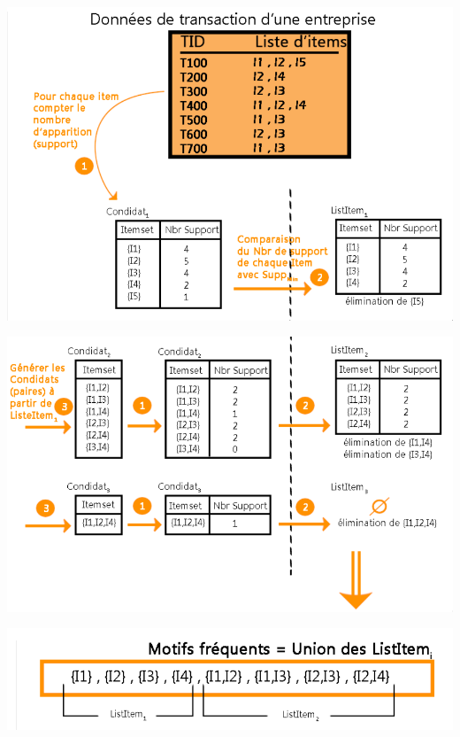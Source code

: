 \documentclass[12pt,a4paper,oneside]{book}
\begin{document}
\begin{center}
	\includegraphics[width=1\textwidth]{image/dm1.PNG}%
\end{center}
\begin{center}
	\includegraphics[width=1\textwidth]{image/dm2.PNG}%
\end{center}
\begin{center}
	\includegraphics[width=1\textwidth]{image/dm3.PNG}%
	\label{labelname}%
\end{center}
\end{document}
